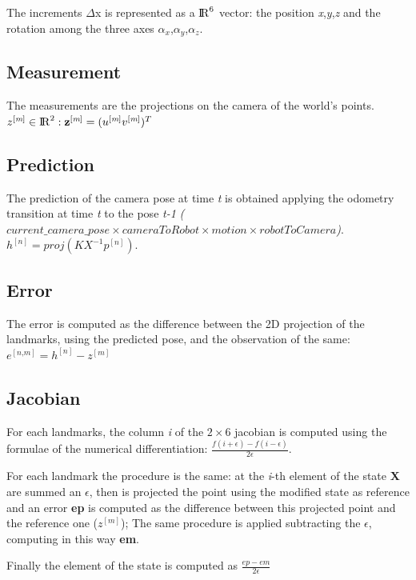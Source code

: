 \documentclass[10pt]{article}
\begin{document}
	The increments $\Delta$x is represented as a ${\rm I\!R}^6$ vector: the position \textit{x},\textit{y},\textit{z} and the rotation among the three axes \textit{$\alpha_x$},\textit{$\alpha_y$},\textit{$\alpha_z$}.
	
	\subsection{Measurement}
	The measurements are the projections on the camera of the world's points.
	$z^{[\textit{m}]} \in {\rm I\!R}^2 : \textbf{z}^{[\textit{m}]} = (u^{[\textit{m}]} v^{[\textit{m}]})^T$
	
	\subsection{Prediction}
	The prediction of the camera pose at time \textit{t} is obtained applying the odometry transition at time \textit{t} to the pose \textit{t-1} \textit{($current\_camera\_pose \times cameraToRobot \times motion \times robotToCamera$)}. \\
	$h^{[\textit{n}]} = proj(K X^{-1} p^{[\textit{n}]})$.
	
	\subsection{Error}
	The error is computed as the difference between the 2D projection of the landmarks, using the predicted pose, and the observation of the same:\\
	$e^{[\textit{n,m}]} = h^{[\textit{n}]} - z^{[\textit{m}]}$
	
	\subsection{Jacobian}
	For each landmarks, the column \textit{i} of the $2\times6$ jacobian is computed using the formulae of the numerical differentiation: $ \frac{f(i +  \epsilon) - f(i-\epsilon)}{2\epsilon}$.
	
	For each landmark the procedure is the same: at the \textit{i}-th element of the state \textbf{X} are summed an $\epsilon$, then is projected the point using the modified state as reference and an error \textbf{ep} is computed as the difference between this projected point and the reference one ($z^{[\textit{m}]}$);
	The same procedure is applied subtracting the $\epsilon$, computing in this way \textbf{em}.
	
	Finally the element of the state is computed as $\frac{ep - em}{2\epsilon}$
	
\end{document}
